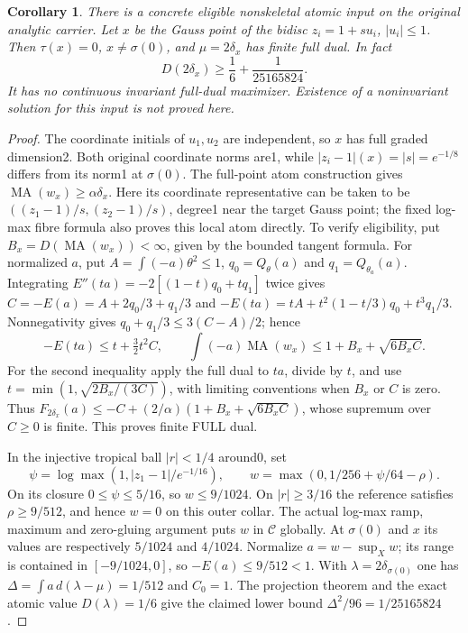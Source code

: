 \documentclass[11pt]{article}
\newtheorem{corollary}[theorem]{Corollary}
\newcommand{\MA}{\operatorname{MA}}
\newcommand{\C}{\mathcal C}
\begin{document}
\begin{corollary}\label{newrad:nonskeletal-example}
There is a concrete eligible nonskeletal atomic input on the original
analytic carrier. Let $x$ be the Gauss point of the bidisc
$z_i=1+s u_i$, $|u_i|\le1$. Then $\tau(x)=0$, $x\ne\sigma(0)$,
and $\mu=2\delta_x$ has finite full dual. In fact
\[
 D(2\delta_x)\ge\frac16+\frac1{25165824}.
\]
It has no continuous invariant full-dual maximizer. Existence of a
noninvariant solution for this input is not proved here.
\end{corollary}
\begin{proof}
The coordinate initials of $u_1,u_2$ are independent, so $x$ has
full graded dimension2. Both original coordinate norms are1, while
$|z_i-1|(x)=|s|=e^{-1/8}$ differs from its norm1 at $\sigma(0)$.
The full-point atom construction gives $\MA(w_x)\ge\alpha\delta_x$.
Here its coordinate representative can be taken to be
$((z_1-1)/s,(z_2-1)/s)$, degree1 near the target Gauss point;
the fixed log-max fibre formula also proves this local atom directly.
To verify eligibility, put $B_x=D(\MA(w_x))<\infty$, given by the
bounded tangent formula. For normalized $a$, put
$A=\int(-a)\theta^2\le1$, $q_0=Q_\theta(a)$ and
$q_1=Q_{\theta_a}(a)$. Integrating
$E''(ta)=-2[(1-t)q_0+tq_1]$ twice gives
$C=-E(a)=A+2q_0/3+q_1/3$ and
$-E(ta)=tA+t^2(1-t/3)q_0+t^3q_1/3$.
Nonnegativity gives $q_0+q_1/3\le3(C-A)/2$; hence
\[
 -E(ta)\le t+\tfrac32t^2C,\qquad
 \int(-a)\MA(w_x)\le1+B_x+\sqrt{6B_x C}.
\]
For the second inequality apply the full dual to $ta$, divide by $t$,
and use $t=\min(1,\sqrt{2B_x/(3C)})$, with limiting conventions
when $B_x$ or $C$ is zero. Thus
$F_{2\delta_x}(a)\le-C+(2/\alpha)(1+B_x+\sqrt{6B_xC})$,
whose supremum over $C\ge0$ is finite. This proves finite FULL dual.

In the injective tropical ball $|r|<1/4$ around0, set
\[
 \psi=\log\max(1,|z_1-1|/e^{-1/16}),\qquad
 w=\max(0,1/256+\psi/64-\rho).
\]
On its closure $0\le\psi\le5/16$, so $w\le9/1024$.
On $|r|\ge3/16$ the reference satisfies $\rho\ge9/512$,
and hence $w=0$ on this outer collar. The actual log-max ramp,
maximum and zero-gluing argument puts $w$ in $\C$ globally.
At $\sigma(0)$ and $x$ its values are respectively $5/1024$ and
$4/1024$. Normalize $a=w-\sup_Xw$; its range is contained in
$[-9/1024,0]$, so $-E(a)\le9/512<1$.
With $\lambda=2\delta_{\sigma(0)}$ one has
$\Delta=\int a\,d(\lambda-\mu)=1/512$ and $C_0=1$.
The projection theorem and the exact atomic value $D(\lambda)=1/6$
give the claimed lower bound $\Delta^2/96=1/25165824$.
\end{proof}
\end{document}
